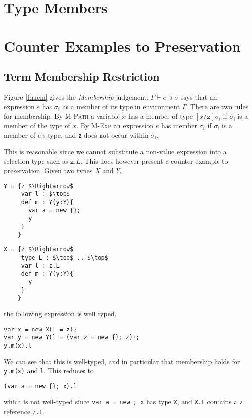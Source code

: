 \documentclass{llncs}
\begin{document}
\section{Type Members}

\section{Counter Examples to Preservation}
	\label{s:examples}

\subsection{Term Membership Restriction}
	\label{s:term_mem}
Figure \ref{f:mem} gives the \emph{Membership} judgement. 
$\Gamma \vdash e \ni \sigma$ says that an expression $e$ 
has $\sigma_i$ as a member of its type in environment $\Gamma$. 
There are two rules for membership. By \textsc{M-Path} a 
variable $x$ has a member of type $[x/\texttt{z}]\sigma_i$ 
if $\sigma_i$ is a member of the type of $x$. By \textsc{M-Exp}
an expression $e$ has member $\sigma_i$ if $\sigma_i$ is 
a member of $e$'s type, and \texttt{z} does not occur 
within $\sigma_i$.

This is reasonable since we cannot substitute a non-value 
expression into a selection type such as $\texttt{z}.L$. 
This does however present a counter-example to preservation. 
Given two types $X$ and $Y$,

\begin{lstlisting}[mathescape, style=custom_lang]
Y = {z $\Rightarrow$
     var l : $\top$
     def m : Y(y:Y){
       var a = new {};
       y
     }
    }
\end{lstlisting}
\begin{lstlisting}[mathescape, style=custom_lang]
X = {z $\Rightarrow$
     type L : $\top$ .. $\top$
     var l : z.L
     def m : Y(y:Y){
       y
     }
    }
\end{lstlisting}

the following expression is well typed.
\begin{lstlisting}[mathescape, style=custom_lang]
var x = new X(l = z);
var y = new Y(l = (var z = new {}; z));
y.m(x).l
\end{lstlisting}
We can see that this is well-typed, and in particular that membership 
holds for \texttt{y.m(x)} and \texttt{l}. This reduces to 
\begin{lstlisting}[mathescape, style=custom_lang]
(var a = new {}; x).l
\end{lstlisting}
which is not well-typed since \texttt{var a = new {}; x} has type 
\texttt{X}, and \texttt{X.l} contains a \texttt{z} reference 
\texttt{z.L}.
\end{document}

